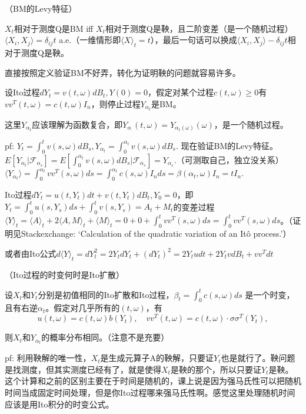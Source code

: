 \begin{thm}（BM的Levy特征）

  $X_t$相对于测度Q是BM iff $X_t$相对于测度Q是鞅，且二阶变差（是一个随机过程）$\langle X_i, X_j \rangle = \delta_{ij} t$ a.e.（一维情形即$\langle X \rangle_t = t$），最后一句话可以换成$\langle X_i, X_j \rangle - \delta_{ij} t$相对于测度Q是鞅。
\end{thm}

直接按照定义验证BM不好弄，转化为证明鞅的问题就容易许多。

设Ito过程$d Y_{t}=v(t, \omega) d B_{t}, Y(0) = 0$，假定对某个过程$c(t, \omega) \geq 0$有$v v^{T}(t, \omega)=c(t, \omega) I_{n}$，则停止过程$Y_{\alpha_{t}}$是BM。

这里$Y_{\alpha_{t}}$应该理解为函数复合，即$Y_{\alpha_{\cdot}}(t, \omega) = Y_{\alpha_t(\omega)}(\omega)$，是一个随机过程。

pf: $Y_t = \int_0^t v(s, \omega) dB_s, Y_{\alpha_t} = \int_0^{\alpha_t} v(s, \omega) dB_s.$ 现在验证BM的Levy特征。$E[Y_{\alpha_t} | \mathcal{F}_{\alpha_s}] = E\left[\int_0^{\alpha_t} v(s, \omega) dB_s | \mathcal{F}_{\alpha_s}\right] = Y_{\alpha_s}.$（可测取自己，独立没关系）$\langle Y_{\alpha_{t}} \rangle=\int_{0}^{\alpha_{t}} v v^{T}(s, \omega) d s = \int_{0}^{\alpha_{t}} c(s, \omega)I_n d s = \beta(\alpha_t, \omega)I_n = tI_n.$ 

Ito过程$dY_t = u(t, Y_t) dt + v(t, Y_t) dB_t, Y_0 = 0$，即$Y_t = \int_0^t u(s, Y_s) ds + \int_0^t v(s, Y_s) = A_t + M_t$的变差过程$\langle Y \rangle_t = \langle A \rangle_t + 2\langle A, M \rangle_t + \langle M \rangle_t = 0 + 0 + \int_0^t v v^T(s, \omega)ds = \int_0^t v v^T(s, \omega)ds$。（证明见Stackexchange: `Calculation of the quadratic variation of an Itô process.'）

或者由Ito公式$d\langle Y \rangle_t = dY_t^2 = 2Y_t dY_t + (dY_t)^2 = 2Y_t u dt + 2Y_t v dB_t + vv^T dt$

\begin{thm}（Ito过程的时变何时是Ito扩散）

  设$X_t$和$Y_t$分别是初值相同的Ito扩散和Ito过程，$\beta_{t}=\int_{0}^{t} c(s, \omega) d s$  是一个时变，且有右逆$\alpha_{t}$。假定对几乎所有的$(t, \omega)$，有
  \[
    u(t, \omega)=c(t, \omega) b\left(Y_{t}\right), \quad v v^{T}(t, \omega)=c(t, \omega) \cdot \sigma \sigma^{T}\left(Y_{t}\right),
  \]

  则$X_{t}$和$Y_{\alpha_{t}}$的概率分布相同。（注意不是充要）
\end{thm}

pf: 利用鞅解的唯一性，$X_t$是生成元算子A的鞅解，只要证$Y_t$也是就行了。鞅问题是找测度，但其实测度已经有了，就是使得$X_t$是鞅的那个，所以只要证$Y_t$是鞅。这个计算和之前的区别主要在于时间是随机的，课上说是因为强马氏性可以把随机时间当成固定时间处理，但是你Ito过程哪来强马氏性啊。感觉这里处理随机时间应该是用Ito积分的时变公式。

